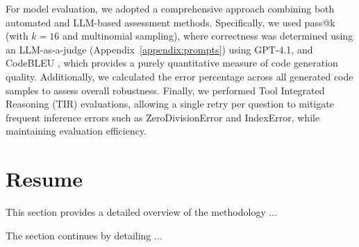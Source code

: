 For model evaluation, we adopted a comprehensive approach combining both automated and LLM-based assessment methods. Specifically, we used pass@k \citep{Levi2024SimpleModelInferenceScalingLaws} (with $k=16$ and multinomial sampling), where correctness was determined using an LLM-as-a-judge \citep{Li2025LLMJudge} (Appendix~\ref{appendix:prompts}) using GPT-4.1, and CodeBLEU \citep{Ren2020CodeBLEU}, which provides a purely quantitative measure of code generation quality. Additionally, we calculated the error percentage across all generated code samples to assess overall robustness. Finally, we performed Tool Integrated Reasoning (TIR) \citep{Fleureau2024NuminaMath} evaluations, allowing a single retry per question to mitigate frequent inference errors such as ZeroDivisionError and IndexError, while maintaining evaluation efficiency.







\section{Resume}

This section provides a detailed overview of the methodology ...

The section continues by detailing ...
